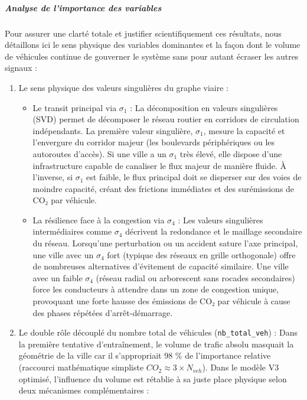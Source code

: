 \documentclass[10pt, a4paper]{article}
\providecommand{\tightlist}{}
\begin{document}
\subparagraph{Analyse de l'importance des
variables}\label{analyse-de-limportance-des-variables}

Pour assurer une clarté totale et justifier scientifiquement ces
résultats, nous détaillons ici le sens physique des variables dominantes
et la façon dont le volume de véhicules continue de gouverner le système
sans pour autant écraser les autres signaux :

\begin{enumerate}
\def\labelenumi{\arabic{enumi}.}
\item
  Le sens physique des valeurs singulières du graphe viaire :

  \begin{itemize}
  \tightlist
  \item
    Le transit principal via \(\sigma_1\) : La décomposition en valeurs
    singulières (SVD) permet de décomposer le réseau routier en
    corridors de circulation indépendants. La première valeur
    singulière, \(\sigma_1\), mesure la capacité et l'envergure du
    corridor majeur (les boulevards périphériques ou les autoroutes
    d'accès). Si une ville a un \(\sigma_1\) très élevé, elle dispose
    d'une infrastructure capable de canaliser le flux majeur de manière
    fluide. À l'inverse, si \(\sigma_1\) est faible, le flux principal
    doit se disperser sur des voies de moindre capacité, créant des
    frictions immédiates et des surémissions de CO₂ par véhicule.
  \item
    La résilience face à la congestion via \(\sigma_4\) : Les valeurs
    singulières intermédiaires comme \(\sigma_4\) décrivent la
    redondance et le maillage secondaire du réseau. Lorsqu'une
    perturbation ou un accident sature l'axe principal, une ville avec
    un \(\sigma_4\) fort (typique des réseaux en grille orthogonale)
    offre de nombreuses alternatives d'évitement de capacité similaire.
    Une ville avec un faible \(\sigma_4\) (réseau radial ou arborescent
    sans rocades secondaires) force les conducteurs à attendre dans un
    zone de congestion unique, provoquant une forte hausse des émissions
    de CO₂ par véhicule à cause des phases répétées d'arrêt-démarrage.
  \end{itemize}
\item
  Le double rôle découplé du nombre total de véhicules
  (\texttt{nb\_total\_veh}) : Dans la première tentative d'entraînement,
  le volume de trafic absolu masquait la géométrie de la ville car il
  s'appropriait 98 \% de l'importance relative (raccourci mathématique
  simpliste \(CO_2 \approx 3 \times N_{veh}\)). Dans le modèle V3
  optimisé, l'influence du volume est rétablie à sa juste place physique
  selon deux mécanismes complémentaires :


\end{enumerate}
\end{document}
